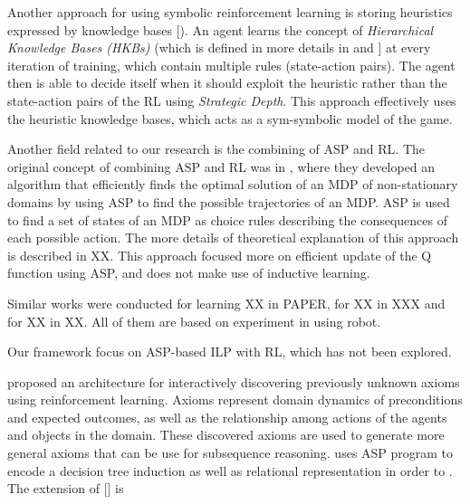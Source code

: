 
Another approach for using symbolic reinforcement learning is storing heuristics expressed by knowledge bases [\cite{Apeldoorn2017}).  
An agent learns the concept of \textit{Hierarchical Knowledge Bases (HKBs)} (which is defined in more details in \cite{Apeldoorn2016} and \cite{Apeldoorn}] at every iteration of training, which contain multiple rules (state-action pairs). 
The agent then is able to decide itself when it should exploit the heuristic rather than the state-action pairs of the RL using  \textit{Strategic Depth}. 
This approach effectively uses the heuristic knowledge bases, which acts as a sym-symbolic model of the game.

Another field related to our research is the combining of ASP and RL. 
The original concept of combining ASP and RL was in \cite{Ferreira2017}, where they developed an algorithm that efficiently finds the optimal solution of an MDP of non-stationary domains by using ASP to find the possible trajectories of an MDP. 
ASP is used to find a set of states of an MDP as choice rules describing the consequences of each possible action.
The more details of theoretical explanation of this approach is described in XX.
This approach focused more on efficient update of the Q function using ASP, and does not make use of inductive learning.

Similar works were conducted for learning XX in PAPER, for XX in XXX and for XX in XX. 
All of them are based on experiment in using robot.


Our framework focus on ASP-based ILP with RL, which has not been explored.


\cite{Meadows2018} proposed an architecture for interactively discovering previously unknown axioms using reinforcement learning.
Axioms represent domain dynamics of preconditions and expected outcomes, as well as the relationship among actions of the agents and objects in the domain.
These discovered axioms are used to generate more general axioms that can be use for subsequence reasoning.
uses ASP program to encode a decision tree induction as well as relational representation in order to . 
The extension of [] is


